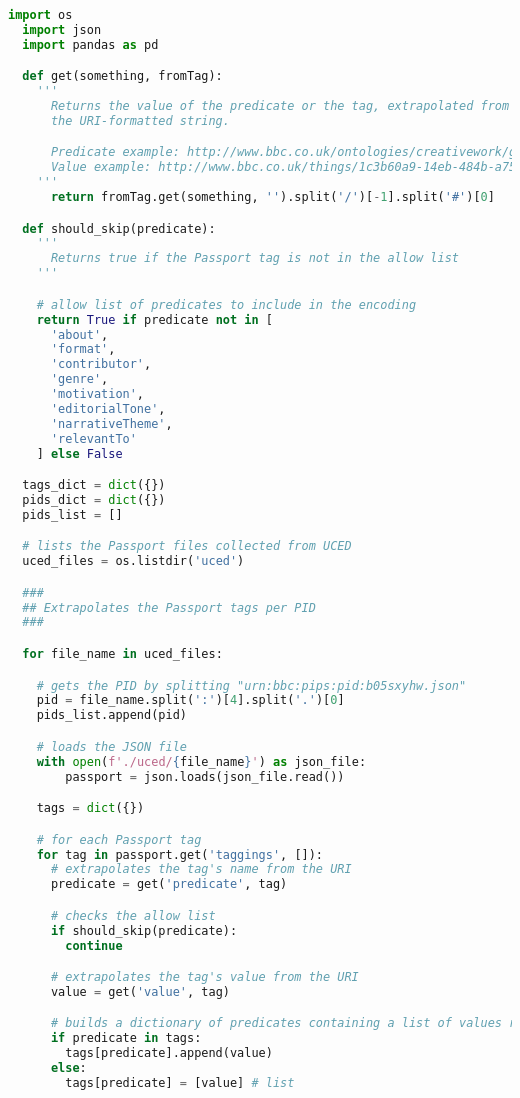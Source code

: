 \begin{lstlisting}[language=Python, caption=One-hot encoding]
  import os
  import json
  import pandas as pd

  def get(something, fromTag):
    '''
      Returns the value of the predicate or the tag, extrapolated from
      the URI-formatted string.

      Predicate example: http://www.bbc.co.uk/ontologies/creativework/genre
      Value example: http://www.bbc.co.uk/things/1c3b60a9-14eb-484b-a750-9f5b1aeaac31#id
    '''
      return fromTag.get(something, '').split('/')[-1].split('#')[0]

  def should_skip(predicate):
    '''
      Returns true if the Passport tag is not in the allow list
    '''

    # allow list of predicates to include in the encoding
    return True if predicate not in [
      'about',
      'format',
      'contributor',
      'genre',
      'motivation',
      'editorialTone',
      'narrativeTheme',
      'relevantTo'
    ] else False

  tags_dict = dict({})
  pids_dict = dict({})
  pids_list = []

  # lists the Passport files collected from UCED
  uced_files = os.listdir('uced')

  ###
  ## Extrapolates the Passport tags per PID
  ###

  for file_name in uced_files:

    # gets the PID by splitting "urn:bbc:pips:pid:b05sxyhw.json"
    pid = file_name.split(':')[4].split('.')[0]
    pids_list.append(pid)

    # loads the JSON file
    with open(f'./uced/{file_name}') as json_file:
        passport = json.loads(json_file.read())

    tags = dict({})

    # for each Passport tag
    for tag in passport.get('taggings', []):
      # extrapolates the tag's name from the URI
      predicate = get('predicate', tag)

      # checks the allow list
      if should_skip(predicate):
        continue

      # extrapolates the tag's value from the URI
      value = get('value', tag)

      # builds a dictionary of predicates containing a list of values related to the current PID
      if predicate in tags:
        tags[predicate].append(value)
      else:
        tags[predicate] = [value] # list


\end{lstlisting}
